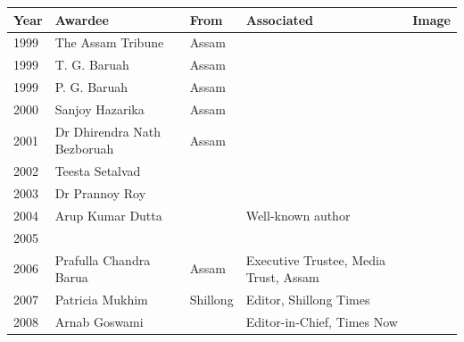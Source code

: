 \documentclass{article}
\begin{document}
\begin{tabular}{lllll}
\toprule
Year & Awardee & From & Associated & Image \\
\midrule
1999 & The Assam Tribune & Assam &  &  \\
1999 & T. G. Baruah & Assam &  &  \\
1999 & P. G. Baruah & Assam &  &  \\
2000 & Sanjoy Hazarika & Assam &  &  \\
2001 & Dr Dhirendra Nath Bezboruah & Assam &  &  \\
2002 & Teesta Setalvad &  &  &  \\
2003 & Dr Prannoy Roy &  &  &  \\
2004 & Arup Kumar Dutta &  & Well-known author &  \\
2005 &  &  &  &  \\
2006 & Prafulla Chandra Barua & Assam & Executive Trustee, Media Trust, Assam &  \\
2007 & Patricia Mukhim & Shillong & Editor, Shillong Times &  \\
2008 & Arnab Goswami &  & Editor-in-Chief, Times Now &  \\
\bottomrule
\end{tabular}
\end{document}
